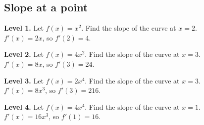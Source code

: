 \documentclass[11pt]{article}
\begin{document}
\subsection*{Slope at a point}
\noindent\textbf{Level 1.} Let $f(x)=x^{2}$. Find the slope of the curve at $x=2$.\\  \quad $f'(x)=2x$, so $f'(2)=4$.\par\medskip
\noindent\textbf{Level 2.} Let $f(x)=4x^{2}$. Find the slope of the curve at $x=3$.\\  \quad $f'(x)=8x$, so $f'(3)=24$.\par\medskip
\noindent\textbf{Level 3.} Let $f(x)=2x^{4}$. Find the slope of the curve at $x=3$.\\  \quad $f'(x)=8x^{3}$, so $f'(3)=216$.\par\medskip
\noindent\textbf{Level 4.} Let $f(x)=4x^{4}$. Find the slope of the curve at $x=1$.\\  \quad $f'(x)=16x^{3}$, so $f'(1)=16$.\par\medskip
\end{document}
